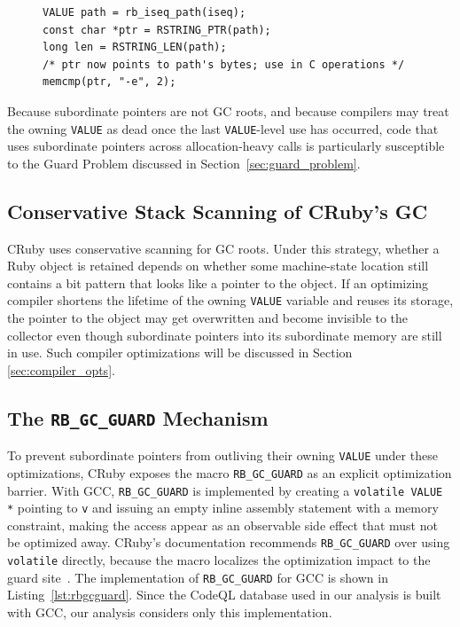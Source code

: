 \begin{figure}[tb]
\begin{lstlisting}[caption={Typical subordinate pointer access pattern.},label={lst:derived_ptr_pattern}]
VALUE path = rb_iseq_path(iseq);
const char *ptr = RSTRING_PTR(path);
long len = RSTRING_LEN(path);
/* ptr now points to path's bytes; use in C operations */
memcmp(ptr, "-e", 2);
\end{lstlisting}
\end{figure}

Because subordinate pointers are not GC roots, and because compilers may treat the owning
\texttt{VALUE} as dead once the last \texttt{VALUE}-level use has occurred, code that
uses subordinate pointers across allocation-heavy calls is particularly susceptible to the
Guard Problem discussed in Section~\ref{sec:guard_problem}.

\subsection{Conservative Stack Scanning of CRuby's GC}
CRuby uses conservative scanning for GC roots. Under this strategy, whether a Ruby object is retained depends on whether some machine-state location still contains a bit pattern that looks like a pointer to the object. If an optimizing compiler shortens the lifetime of the owning \texttt{VALUE} variable and reuses its storage, the pointer to the object may get overwritten and become invisible to the collector even though subordinate pointers into its subordinate memory are still in use. Such compiler optimizations will be discussed in Section \ref{sec:compiler_opts}.


\subsection{The \texttt{RB\_GC\_GUARD} Mechanism}
To prevent subordinate pointers from outliving their owning \texttt{VALUE} under these optimizations, CRuby exposes the macro \texttt{RB\_GC\_GUARD} as an explicit optimization barrier. With GCC, \texttt{RB\_GC\_GUARD} is implemented by creating a \texttt{volatile VALUE *} pointing to \texttt{v} and issuing an empty inline assembly statement with a memory constraint, making the access appear as an observable side effect that must not be optimized away. CRuby's documentation recommends \texttt{RB\_GC\_GUARD} over using \texttt{volatile} directly, because the macro localizes the optimization impact to the guard site~\cite{ruby_capi_rb_gc_guard}. The implementation of \texttt{RB\_GC\_GUARD} for GCC is shown in Listing~\ref{lst:rbgcguard}. Since the CodeQL database used in our analysis is built with GCC, our analysis considers only this implementation.

